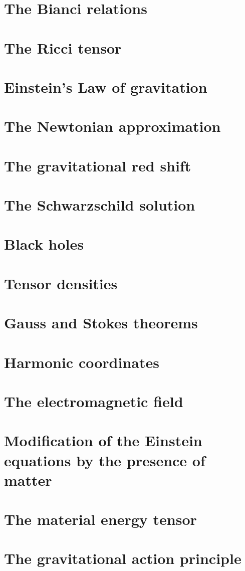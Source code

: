 \documentclass[12pt]{article}
\numberwithin{equation}{section}
\begin{document}
\section{The Bianci relations}

\section{The Ricci tensor}

\section{Einstein's Law of gravitation}

\section{The Newtonian approximation}

\section{The gravitational red shift}

\section{The Schwarzschild solution}

\section{Black holes}

\section{Tensor densities}

\section{Gauss and Stokes theorems}

\section{Harmonic coordinates}

\section{The electromagnetic field}

\section{Modification of the Einstein equations by the presence of matter}

\section{The material energy tensor}

\section{The gravitational action principle}

\end{document}
